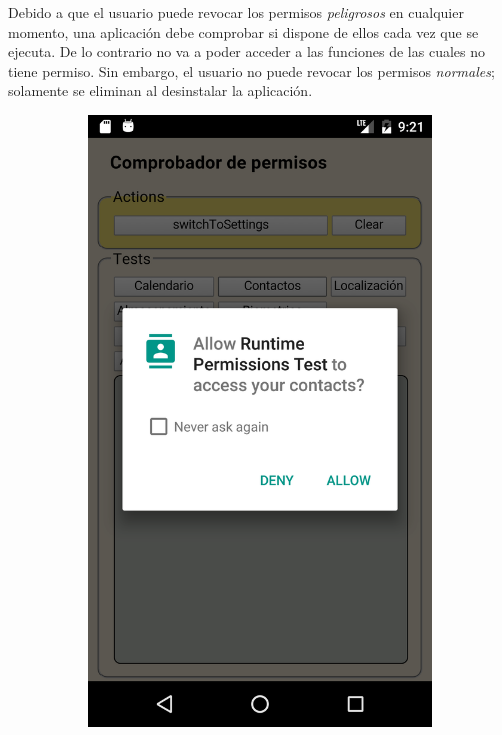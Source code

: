Debido a que el usuario puede revocar los permisos \emph{peligrosos} en cualquier momento, una aplicación debe comprobar si dispone de ellos cada vez que se ejecuta. De lo contrario no va a poder acceder a las funciones de las cuales no tiene permiso. Sin embargo, el usuario no puede revocar los permisos \emph{normales}; solamente se eliminan al desinstalar la aplicación.
\begin{figure}[btp]
    \centering
    \begin{subfigure}{0.35\linewidth}
        \includegraphics[width=\linewidth]{imgs/chapter5/allow_contact}

\end{subfigure}
\end{figure}

